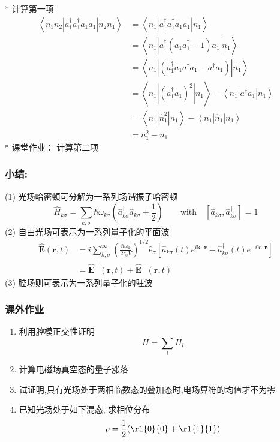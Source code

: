  \begin{frame} 
 \frametitle{}
     * 计算第一项 
  \[ \begin{aligned}
  \left\langle n_1 n_2|a^{\dagger} _1 a^{\dagger} _1 a_1 a_1|n_2n_1  \right\rangle  &= \left\langle n_1|a^{\dagger} _1 a^{\dagger} _1 a_1 a_1|n_1  \right\rangle \\ 
  &= \left\langle n_1|a^{\dagger} _1 (a_1a^{\dagger} _1 -1) a_1|n_1  \right\rangle \\ 
  &= \left\langle n_1|(a^{\dagger} _1 a_1a^{\dagger} a_1 - a^{\dagger} a_1) |n_1  \right\rangle \\ 
  &= \left\langle n_1|(a^{\dagger} _1 a_1)^2 |n_1 \right\rangle - \left\langle n_1| a^{\dagger} a_1 |n_1  \right\rangle\\ 
  &= \left\langle n_1|\hat{n}^2 _1 |n_1 \right\rangle - \left\langle n_1| \hat{n}_1 |n_1  \right\rangle\\ 
  &= n_1 ^2 -n_1
 \end{aligned}\]
 * 课堂作业： 计算第二项
\end{frame}

\begin{frame} 
  \frametitle{小结:}
    (1) 光场哈密顿可分解为一系列场谐振子哈密顿
    \[ \hat{H}_{k\sigma}= \sum_{k,\sigma}\hbar \omega_{k\sigma} \left(\hat{a}^\dagger _{k\sigma} \hat{a} _{k\sigma}+ \frac{1 }{2}\right) \qquad \text{with} \quad [\hat{a} _{k\sigma},\hat{a}^\dagger _{k\sigma}]=1 \]
    (2) 自由光场可表示为一系列量子化的平面波 
    \[\begin{aligned}
      \hat{\mathbf{E}} (\mathbf{r},t) &=i \sum^\infty _{k,\sigma} (\frac{\hbar\omega_k}{2 \epsilon_0 V } )^{1/2} \hat{e}_\sigma \left[ \hat{a} _{k\sigma} (t) e^{i \mathbf{k}\cdot \mathbf{r}} - \hat{a} ^\dagger _{k\sigma} (t)  e^{-i \mathbf{k}\cdot \mathbf{r}}\right] \\
      &= \hat{\mathbf{E}}^+(\mathbf{r},t)+ \hat{\mathbf{E}}^-(\mathbf{r},t)
    \end{aligned} \]
    (3) 腔场则可表示为一系列量子化的驻波
  \end{frame}

\begin{frame}
    \frametitle{课外作业}
    \begin{enumerate}
        \item  利用腔模正交性证明 \[ H= \sum_l H_l\]
        \item  计算电磁场真空态的量子涨落
        \item  试证明,只有光场处于两相临数态的叠加态时,电场算符的均值才不为零
        \item  已知光场处于如下混态, 求相位分布  \[ \rho = \frac{1}{2}(\rl{0}{0} + \rl{1}{1} ) \]
    \end{enumerate}
\end{frame}

